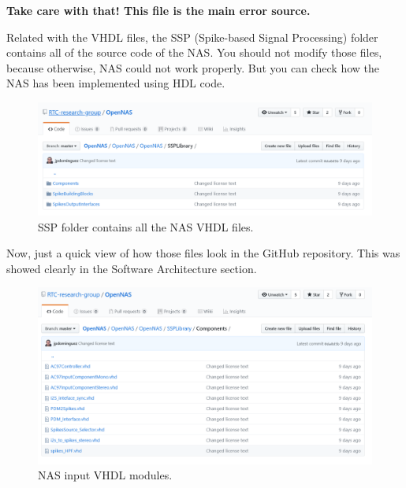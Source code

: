 \textbf{Take care with that! This file is the main error source.}

Related with the VHDL files, the SSP (Spike-based Signal Processing) folder contains all of the source code of the NAS. You should not modify those files, because otherwise, NAS could not work properly. But you can check how the NAS has been implemented using HDL code. 

\begin{figure}[H]
\centering
\includegraphics[width=1\textwidth]{images/Img06_SSP.PNG}
\caption{\label{fig:OpenNAS_SSPFolder}SSP folder contains all the NAS VHDL files.}
\end{figure}

Now, just a quick view of how those files look in the GitHub repository. This was showed clearly in the Software Architecture section.

\begin{figure}[H]
\centering
\includegraphics[width=1\textwidth]{images/Img07_Components.PNG}
\caption{\label{fig:OpenNAS_SSP_Components}NAS input VHDL modules.}
\end{figure}

